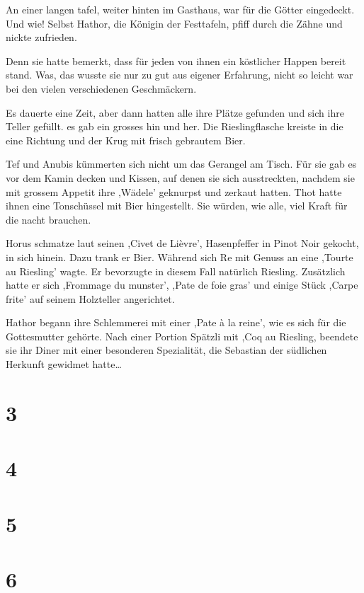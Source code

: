 An einer langen tafel, weiter hinten im Gasthaus, war für die Götter eingedeckt. Und wie! Selbst Hathor, die Königin der Festtafeln, pfiff durch die Zähne und nickte zufrieden. 

Denn sie hatte bemerkt, dass für jeden von ihnen ein köstlicher Happen bereit stand. Was, das wusste sie nur zu gut aus eigener Erfahrung, nicht so leicht war bei den vielen verschiedenen Geschmäckern.

Es dauerte eine Zeit, aber dann hatten alle ihre Plätze gefunden und sich ihre Teller gefüllt. es gab ein grosses hin und her. Die Rieslingflasche kreiste in die eine Richtung und der Krug mit frisch gebrautem Bier.

Tef und Anubis kümmerten sich nicht um das Gerangel am Tisch. Für sie gab es vor dem Kamin decken und Kissen, auf denen sie sich ausstreckten, nachdem sie mit grossem Appetit ihre ,Wädele' geknurpst und zerkaut hatten. Thot hatte ihnen eine Tonschüssel mit Bier hingestellt. Sie würden, wie alle, viel Kraft für die nacht brauchen.

Horus schmatze laut seinen ,Civet de Lièvre', Hasenpfeffer in Pinot Noir gekocht, in sich hinein. Dazu trank er Bier. Während sich Re mit Genuss an eine ,Tourte au Riesling' wagte. Er bevorzugte in diesem Fall natürlich Riesling. Zusätzlich hatte er sich ,Frommage du munster', ,Pate de foie gras' und einige Stück ,Carpe frite' auf seinem Holzteller angerichtet.

Hathor begann ihre Schlemmerei mit einer ,Pate à la reine', wie es sich für die Gottesmutter gehörte. Nach einer Portion Spätzli mit ,Coq au Riesling, beendete sie ihr Diner mit einer besonderen Spezialität, die Sebastian der südlichen Herkunft gewidmet hatte\dots

\section*{3}



\section*{4}

\section*{5}

\section*{6}


